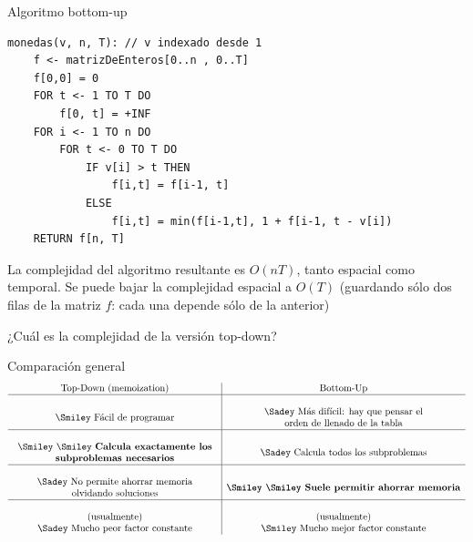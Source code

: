 \documentclass{beamer}
\begin{document}
\begin{frame}[fragile]{Algoritmo bottom-up}
\begin{lstlisting}
monedas(v, n, T): // v indexado desde 1
    f <- matrizDeEnteros[0..n , 0..T]
    f[0,0] = 0
    FOR t <- 1 TO T DO
        f[0, t] = +INF
    FOR i <- 1 TO n DO
        FOR t <- 0 TO T DO
            IF v[i] > t THEN
                f[i,t] = f[i-1, t]  
            ELSE
                f[i,t] = min(f[i-1,t], 1 + f[i-1, t - v[i])
    RETURN f[n, T]
\end{lstlisting}

La complejidad del algoritmo resultante es $O(nT)$, tanto espacial como temporal. Se puede bajar la complejidad espacial a $O(T)$ (guardando sólo dos filas de la matriz $f$: cada una depende sólo de la anterior)

¿Cuál es la complejidad de la versión top-down?
\end{frame}

\begin{frame}{Comparación general}
\small
$$\begin{array}{c|c}
\mbox{Top-Down (memoization)} & \mbox{Bottom-Up}\\
\hline \\
\mbox{\Smiley Fácil de programar} & \begin{array}{c}\mbox{\Sadey Más difícil: hay que pensar el} \\ \mbox{orden de llenado de la tabla}\end{array}\\
\hline \\
\begin{array}{c}\mbox{\Smiley \Smiley \textbf{Calcula exactamente los}} \\ \mbox{\textbf{subproblemas necesarios}}\end{array} & \mbox{\Sadey Calcula todos los subproblemas}\\
\hline \\
\begin{array}{c}\mbox{\Sadey No permite ahorrar memoria} \\ \mbox{olvidando soluciones}\end{array} & \mbox{\textbf{\Smiley \Smiley Suele permitir ahorrar memoria}}\\
\hline \\
\begin{array}{c} \mbox{(usualmente)} \\ \mbox{\Sadey Mucho peor factor constante} \end{array} & \begin{array}{c} \mbox{(usualmente)} \\ \mbox{\Smiley Mucho mejor factor constante}\end{array}\\
\end{array}$$
\end{frame}
\end{document}
